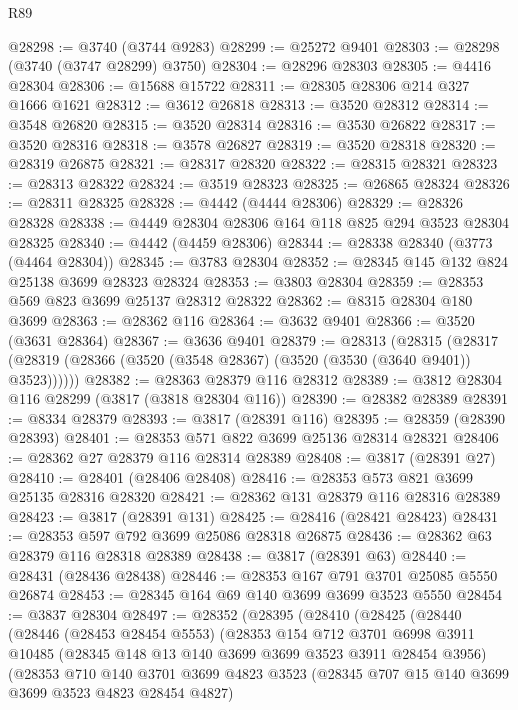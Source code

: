 \begin{lexlean}{R89}
\begin{coremodule}
@28298 := @3740 (@3744 @9283)
@28299 := @25272 @9401
@28303 := @28298 (@3740 (@3747 @28299) @3750)
@28304 := @28296 @28303
@28305 := @4416 @28304
@28306 := @15688 @15722
@28311 := @28305 @28306 @214 @327 @1666 @1621
@28312 := @3612 @26818
@28313 := @3520 @28312
@28314 := @3548 @26820
@28315 := @3520 @28314
@28316 := @3530 @26822
@28317 := @3520 @28316
@28318 := @3578 @26827
@28319 := @3520 @28318
@28320 := @28319 @26875
@28321 := @28317 @28320
@28322 := @28315 @28321
@28323 := @28313 @28322
@28324 := @3519 @28323
@28325 := @26865 @28324
@28326 := @28311 @28325
@28328 := @4442 (@4444 @28306)
@28329 := @28326 @28328
@28338 := @4449 @28304 @28306 @164 @118 @825 @294 @3523 @28304 @28325
@28340 := @4442 (@4459 @28306)
@28344 := @28338 @28340 (@3773 (@4464 @28304))
@28345 := @3783 @28304
@28352 := @28345 @145 @132 @824 @25138 @3699 @28323 @28324
@28353 := @3803 @28304
@28359 := @28353 @569 @823 @3699 @25137 @28312 @28322
@28362 := @8315 @28304 @180 @3699
@28363 := @28362 @116
@28364 := @3632 @9401
@28366 := @3520 (@3631 @28364)
@28367 := @3636 @9401
@28379 := @28313
    (@28315 (@28317 (@28319 (@28366 (@3520 (@3548 @28367) (@3520 (@3530 (@3640 @9401)) @3523))))))
@28382 := @28363 @28379 @116 @28312
@28389 := @3812 @28304 @116 @28299 (@3817 (@3818 @28304 @116))
@28390 := @28382 @28389
@28391 := @8334 @28379
@28393 := @3817 (@28391 @116)
@28395 := @28359 (@28390 @28393)
@28401 := @28353 @571 @822 @3699 @25136 @28314 @28321
@28406 := @28362 @27 @28379 @116 @28314 @28389
@28408 := @3817 (@28391 @27)
@28410 := @28401 (@28406 @28408)
@28416 := @28353 @573 @821 @3699 @25135 @28316 @28320
@28421 := @28362 @131 @28379 @116 @28316 @28389
@28423 := @3817 (@28391 @131)
@28425 := @28416 (@28421 @28423)
@28431 := @28353 @597 @792 @3699 @25086 @28318 @26875
@28436 := @28362 @63 @28379 @116 @28318 @28389
@28438 := @3817 (@28391 @63)
@28440 := @28431 (@28436 @28438)
@28446 := @28353 @167 @791 @3701 @25085 @5550 @26874
@28453 := @28345 @164 @69 @140 @3699 @3699 @3523 @5550
@28454 := @3837 @28304
@28497 := @28352
    (@28395
      (@28410
        (@28425
          (@28440
            (@28446
              (@28453 @28454 @5553)
              (@28353
                @154
                @712
                @3701
                @6998
                @3911
                @10485
                (@28345 @148 @13 @140 @3699 @3699 @3523 @3911 @28454 @3956)
                (@28353
                  @710
                  @140
                  @3701
                  @3699
                  @4823
                  @3523
                  (@28345 @707 @15 @140 @3699 @3699 @3523 @4823 @28454 @4827)

\end{coremodule}
\end{lexlean}
